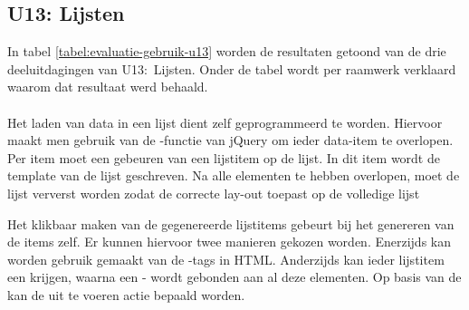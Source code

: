 \subsection{U13: Lijsten}
In tabel \ref{tabel:evaluatie-gebruik-u13} worden de resultaten getoond van de drie deeluitdagingen van U13:~Lijsten.
Onder de tabel wordt per raamwerk verklaard waarom dat resultaat werd behaald.

\begin{table}[H]
\centering
{}
\caption{Gebruik voor U13: Lijsten}
\label{tabel:evaluatie-gebruik-u13}
\end{table}

\paragraph{\jqm}
Het laden van data in een lijst dient zelf geprogrammeerd te worden.
Hiervoor maakt men gebruik van de -functie van jQuery om ieder data-item te overlopen.
Per item moet een  gebeuren van een lijstitem op de lijst.
In dit item wordt de template van de lijst geschreven.
Na alle elementen te hebben overlopen, moet de lijst ververst worden zodat \jqm{} de correcte lay-out toepast op de volledige lijst

Het klikbaar maken van de gegenereerde lijstitems gebeurt bij het genereren van de items zelf.
Er kunnen hiervoor twee manieren gekozen worden.
Enerzijds kan worden gebruik gemaakt van de -tags in HTML.
Anderzijds kan ieder lijstitem een  krijgen, waarna een -  wordt gebonden aan al deze elementen.
Op basis van de  kan de uit te voeren actie bepaald worden.

